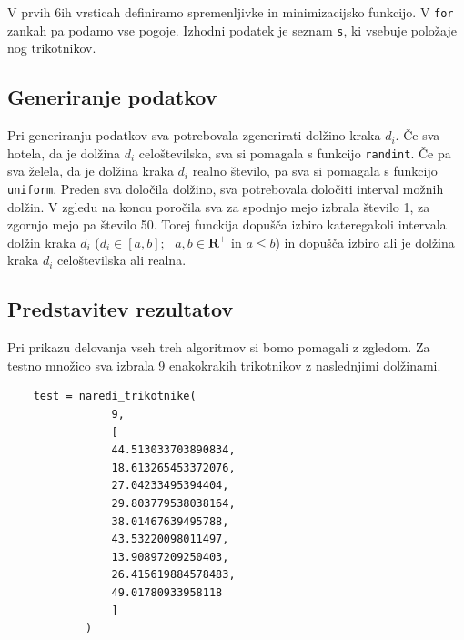 \documentclass[a4paper,12pt]{article}
\theoremstyle{definition}
\theoremstyle{plain}
\begin{document}
V prvih 6ih vrsticah definiramo spremenljivke in minimizacijsko funkcijo. V \texttt{for} zankah pa podamo vse pogoje.
Izhodni podatek je seznam \texttt{s}, ki vsebuje položaje nog trikotnikov. 

\subsection{Generiranje podatkov}
Pri generiranju podatkov sva potrebovala zgenerirati dolžino kraka $d_{i}$. Če sva hotela, da je dolžina $d_{i}$
celoštevilska, sva si pomagala s funkcijo \texttt{randint}. Če pa sva želela, da je dolžina kraka $d_{i}$ realno število,
pa sva si pomagala s funkcijo \texttt{uniform}. Preden sva določila dolžino, sva potrebovala določiti
interval možnih dolžin. V zgledu na koncu poročila sva za spodnjo mejo izbrala število 1, za
zgornjo mejo pa število 50. 
Torej funckija dopušča izbiro kateregakoli intervala dolžin kraka $d_{i}$ 
($d_{i} \in [a,b]; \text{ } a, b \in \mathbf{R}^+  \text{ in } a \leq b$) in dopušča izbiro ali je dolžina kraka $d_{i}$ celoštevilska
ali realna.

\newpage

\subsection{Predstavitev rezultatov}
Pri prikazu delovanja vseh treh algoritmov si bomo pomagali z zgledom.
Za testno množico sva izbrala 9 enakokrakih trikotnikov z naslednjimi dolžinami.

\begin{verbatim}
    test = naredi_trikotnike(
                9,
                [ 
                44.513033703890834,
                18.613265453372076,
                27.04233495394404,
                29.803779538038164,
                38.01467639495788,
                43.53220098011497,
                13.90897209250403,
                26.415619884578483,
                49.01780933958118
                ]
            )
\end{verbatim}
\end{document}
